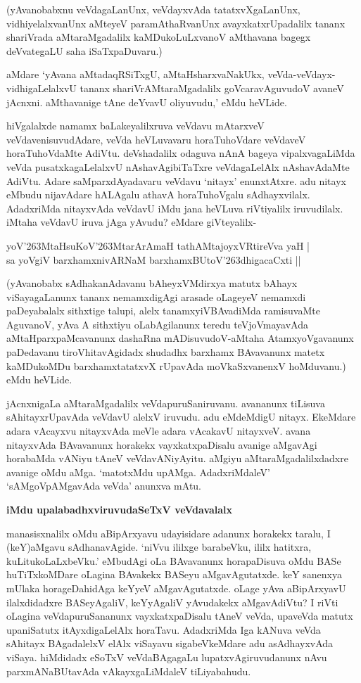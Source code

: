 \noindent
(yAvanobabxnu veVdagaLanUnx, veVdayxvAda tatatxvXgaLanUnx, vidhiyelalxvanUnx aMteyeV paramAthaRvanUnx avayxkatxrUpadalilx tananx shariVrada aMtaraMgadalilx kaMDukoLuLxvanoV aMthavana bagegx deVvategaLU saha iSaTxpaDuvaru.) 

aMdare `yAvana aMtadaqRSiTxgU, aMtaHsharxvaNakUkx, veVda-veVdayx-vidhigaLelalxvU tananx shariVrAMtaraMgadalilx goVcaravAguvudoV avaneV jAcnxni. aMthavanige tAne deYvavU oliyuvudu,' eMdu heVLide. 

hiVgalalxde namamx baLakeyalilxruva veVdavu mAtarxveV veVdavenisuvudAdare, veVda heVLuvavaru horaTuhoVdare veVdaveV horaTuhoVdaMte AdiVtu. deVshadalilx odaguva nAnA bageya vipalxvagaLiMda veVda pusatxkagaLelalxvU nAshavAgibiTaTxre veVdagaLelAlx nAshavAdaMte AdiVtu. Adare saMparxdAyadavaru veVdavu `nitayx' enunxtAtxre. adu nitayx eMbudu nijavAdare hALAgalu athavA horaTuhoVgalu sAdhayxvilalx. AdadxriMda nitayxvAda veVdavU iMdu jana heVLuva riVtiyalilx iruvudilalx. iMtaha veVdavU iruva jAga yAvudu? eMdare giVteyalilx-

\begin{shloka}
yoV\char'263MtaHsuKoV\char'263MtarArAmaH tathAMtajoyxVRtireVva yaH |\\\label{134}
sa yoVgiV barxhamxnivARNaM barxhamxBUtoV\char'263dhigacaCxti ||
\end{shloka}

\noindent
(yAvanobabx sAdhakanAdavanu bAheyxVMdirxya matutx bAhayx viSayagaLanunx tananx nemamxdigAgi arasade oLageyeV nemamxdi paDeyabalalx sithxtige talupi, alelx tanamxyiVBAvadiMda ramisuvaMte AguvanoV, yAva A sithxtiyu oLabAgilanunx teredu teVjoVmayavAda aMtaHparxpaMcavanunx dashaRna mADisuvudoV-aMtaha AtamxyoVgavanunx paDedavanu tiroVhitavAgidadx shudadhx barxhamx BAvavanunx matetx kaMDukoMDu barxhamxtatatxvX rUpavAda moVkaSxvanenxV hoMduvanu.) eMdu heVLide. 

jAcnxnigaLa aMtaraMgadalilx veVdapuruSaniruvanu. avananunx tiLisuva sAhitayxrUpavAda veVdavU alelxV iruvudu. adu eMdeMdigU nitayx. EkeMdare adara vAcayxvu nitayxvAda meVle adara vAcakavU nitayxveV. avana nitayxvAda BAvavanunx horakekx vayxkatxpaDisalu avanige aMgavAgi horabaMda vANiyu tAneV veVdavANiyAyitu. aMgiyu aMtaraMgadalilxdadxre avanige oMdu aMga. `matotxMdu upAMga. AdadxriMdaleV' `sAMgoVpAMgavAda veVda' anunxva mAtu.

{\bigskip
\noindent
{\large\bf iMdu upalabadhxviruvudaSeTxV veVdavalalx}}\label{page134}
\medskip

\noindent
manasisxnalilx oMdu aBipArxyavu udayisidare adanunx horakekx taralu, I (keY)aMgavu sAdhanavAgide. `niVvu ililxge barabeVku, ililx hatitxra, kuLitukoLaLxbeVku.' eMbudAgi oLa BAvavanunx horapaDisuva oMdu BASe huTiTxkoMDare oLagina BAvakekx BASeyu aMgavAgutatxde. keY sanenxya mUlaka horageDahidAga keYyeV aMgavAgutatxde. oLage yAva aBipArxyavU ilalxdidadxre BASeyAgaliV, keYyAgaliV yAvudakekx aMgavAdiVtu? I riVti oLagina veVdapuruSananunx vayxkatxpaDisalu tAneV veVda, upaveVda matutx upaniSatutx itAyxdigaLelAlx horaTavu. AdadxriMda Iga kANuva veVda sAhitayx BAgadalelxV elAlx viSayavu sigabeVkeMdare adu asAdhayxvAda viSaya. hiMdidadx eSoTxV veVdaBAgagaLu lupatxvAgiruvudanunx nAvu parxmANaBUtavAda vAkayxgaLiMdaleV tiLiyabahudu.

